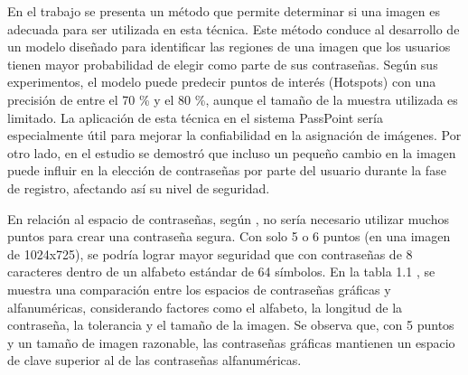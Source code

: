 \documentclass[12pt]{report}
\begin{document}
	
	En el trabajo \cite{18} se presenta un método que permite determinar si una imagen es adecuada para ser utilizada en esta técnica. Este método conduce al desarrollo de un modelo diseñado para identificar las regiones de una imagen que los usuarios tienen mayor probabilidad de elegir como parte de sus contraseñas. Según sus experimentos, el modelo puede predecir puntos de interés (Hotspots) con una precisión de entre el 70 \% y el 80 \%, aunque el tamaño de la muestra utilizada es limitado. La aplicación de esta técnica en el sistema PassPoint sería especialmente útil para mejorar la confiabilidad en la asignación de imágenes. Por otro lado, en el estudio \cite{19} se demostró que incluso un pequeño cambio en la imagen puede influir en la elección de contraseñas por parte del usuario durante la fase de registro, afectando así su nivel de seguridad.    

	
	En relación al espacio de contraseñas, según \cite{1}, no sería necesario utilizar muchos puntos para crear una contraseña segura. Con solo 5 o 6 puntos (en una imagen de 1024x725), se podría lograr mayor seguridad que con contraseñas de 8 caracteres dentro de un alfabeto estándar de 64 símbolos. En la tabla 1.1 , se muestra una comparación entre los espacios de contraseñas gráficas y alfanuméricas, considerando factores como el alfabeto, la longitud de la contraseña, la tolerancia y el tamaño de la imagen. Se observa que, con 5 puntos y un tamaño de imagen razonable, las contraseñas gráficas mantienen un espacio de clave superior al de las contraseñas alfanuméricas.
	
\end{document}
